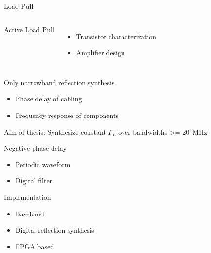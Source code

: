 \documentclass{beamer}
\begin{document}
\begin{frame}{Load Pull}
\begin{columns}
\begin{exampleblock}{Active Load Pull}
{
                }
            \end{exampleblock}
            \begin{itemize}
                \item Transistor characterization
                \item Amplifier design
            \end{itemize}
    \end{columns}
\end{frame}

\begin{frame}
    \begin{block}{Only narrowband reflection synthesis}
        \begin{itemize}
            \item Phase delay of cabling
            \item Frequency response of components
        \end{itemize}
    \end{block}
    \begin{exampleblock}{Aim of thesis: Synthesize constant $\Gamma_L$ over bandwidths \SI{>= 20}{\mega\hertz}}
        \centering
        \begin{minipage}{.9\textwidth}
            \begin{block}{Negative phase delay}
                \begin{itemize}
                    \item Periodic waveform
                    \item Digital filter
                \end{itemize}
            \end{block}
            \begin{block}{Implementation}
                \begin{itemize}
                    \item Baseband
                    \item Digital reflection synthesis
                    \item FPGA based
                \end{itemize}
            \end{block}
        \end{minipage}
    \end{exampleblock}
\end{frame}
\end{document}
